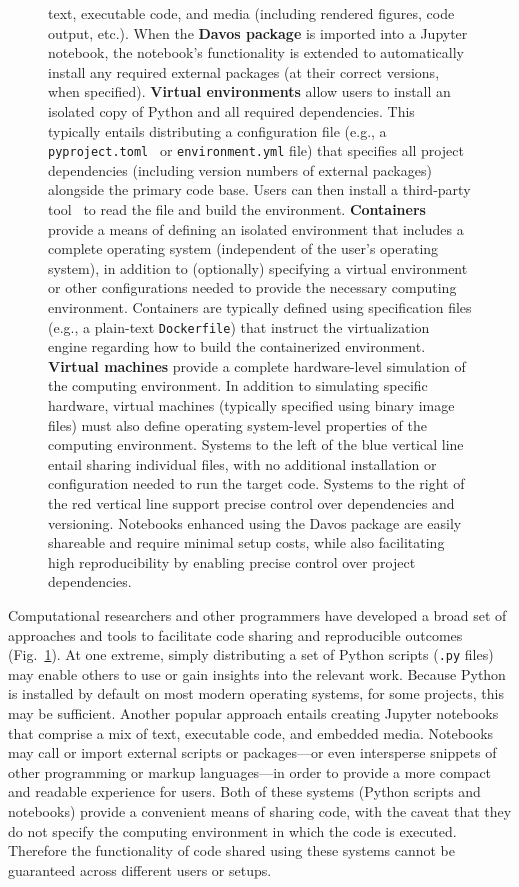 \documentclass[preprint,12pt,a4paper]{elsarticle}
\begin{document}
\begin{figure}[tp]
{  text, executable code, and media (including rendered figures, code
  output, etc.).  When the \textbf{Davos package} is imported
  into a Jupyter notebook, the notebook's functionality is extended to
  automatically install any required external packages (at their
  correct versions, when specified).  \textbf{Virtual environments}
  allow users to install an isolated copy of Python and all required
  dependencies. This typically entails distributing a configuration
  file (e.g., a \texttt{pyproject.toml}~\cite{CannEtal16} or
  \texttt{environment.yml} file) that specifies all project
  dependencies (including version numbers of external packages)
  alongside the primary code base. Users can then install a
  third-party tool~\cite[e.g.,][]{Anac12, Eust19} to read the file and
  build the environment.  \textbf{Containers} provide a means of
  defining an isolated environment that includes a complete operating
  system (independent of the user's operating system), in addition to
  (optionally) specifying a virtual environment or other
  configurations needed to provide the necessary computing
  environment.  Containers are typically defined using specification
  files (e.g., a plain-text \texttt{Dockerfile}) that instruct the
  virtualization engine regarding how to build the containerized
  environment.  \textbf{Virtual machines} provide a complete
  hardware-level simulation of the computing environment.  In addition
  to simulating specific hardware, virtual machines (typically
  specified using binary image files) must also define operating
  system-level properties of the computing environment.  Systems to
  the left of the blue vertical line entail sharing individual files,
  with no additional installation or configuration needed to run the
  target code.  Systems to the right of the red vertical line support
  precise control over dependencies and versioning.  Notebooks
  enhanced using the Davos package are easily shareable and
  require minimal setup costs, while also facilitating high
  reproducibility by enabling precise control over project
  dependencies.}
\label{fig:code-sharing}
\end{figure}

Computational researchers and other programmers have de\-vel\-oped a
broad set of approaches and tools to facilitate code sharing and
reproducible outcomes (Fig.~\ref{fig:code-sharing}). At one extreme,
simply distributing a set of Python scripts (\texttt{.py} files) may
enable others to use or gain insights into the relevant work. Because
Python is installed by default on most modern operating systems, for
some projects, this may be sufficient. Another popular approach
entails creating Jupyter notebooks~\cite{KluyEtal16} that comprise a
mix of text, executable code, and embedded media. Notebooks may call
or import external scripts or packages---or even intersperse snippets
of other programming or markup lang\-uages---in order to provide a
more compact and readable experience for users. Both of these systems
(Python scripts and notebooks) provide a convenient means of sharing
code, with the caveat that they do not specify the computing
environment in which the code is executed. Therefore the functionality
of code shared using these systems cannot be guaranteed across
different users or setups.
\end{document}
